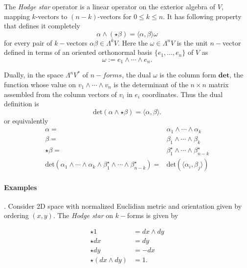 {    The \textit{Hodge star} operator is a linear operator on the exterior algebra of $V$, mapping $k$-vectors to $(n-k)$-vectors for $0\leq k \leq n$. It has following property that defines it completely
    \begin{equation}
        \alpha\wedge(\star\beta) = \langle\alpha,\beta\rangle\omega 
    \end{equation}
    for every pair of $k-$vectors $\alpha\beta\in\Lambda^kV$.
    Here the $\omega\in\Lambda^nV$ is the unit $n-$vector defined in terms of an oriented orthonormal basis $\{e_1,...,e_n\}$ of $V$ as
    \begin{equation}
        \omega := e_1 \wedge \cdots \wedge e_n.
    \end{equation}
    
    Dually, in the space $\Lambda^n V^*$ of $n-forms$, the dual $\omega$ is the column form $\textbf{det}$, the function whose value on $v_1\wedge\cdots\wedge v_n$ is the determinant of the $n\times n$ matrix assembled from the column vectors of $v_i$ in $e_i$ coordinates. Thus the dual definition is 
    \begin{equation}
        \text{det}(\alpha\wedge\star\beta) = \langle\alpha,\beta\rangle.
    \end{equation}
    or equivalently 
    \begin{align}
        \alpha =& \alpha_1\wedge\cdots\wedge\alpha_k \\
        \beta =& \beta_1\wedge\cdots\wedge\beta_k \\
        \star\beta =& \beta_1 ^{\star} \wedge\cdots\wedge \beta_{n-k} ^ {\star} \\
        \text{det}(\alpha_1\wedge\cdots\wedge\alpha_k\wedge\beta_1 ^{\star}\wedge\cdots\wedge\beta_{n-k}^{\star}) =& \text{det}(\langle\alpha_i,\beta_j\rangle)
    \end{align}
    
    \paragraph{Examples}.
    Consider 2D space with normalized Euclidian metric and orientation given by ordering $(x,y)$. The \textit{Hodge star} on $k-$forms is given by 
    
    \begin{align}
        \star 1 &= dx \wedge dy \\
        \star dx &= dy \\
        \star dy &= -dx \\
        \star(dx \wedge dy) &= 1.
    \end{align}
    
}
